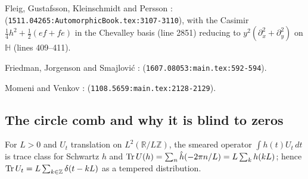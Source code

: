 \begin{citedfact}
\label{cit:fgkp-casimir-laplacian}
Fleig, Gustafsson, Kleinschmidt and Persson \cite{fleig2018eisenstein}:
\texttt{}
(\texttt{1511.04265:AutomorphicBook.tex:3107-3110}), with the Casimir
$\tfrac14 h^2 + \tfrac12(ef+fe)$ in the Chevalley basis (line 2851) reducing
to $y^2(\partial_x^2+\partial_y^2)$ on $\mathbb H$ (lines 409--411).
\end{citedfact}

\begin{citedfact}
\label{cit:fjs-scattering-det}
Friedman, Jorgenson and Smajlovi\'c \cite{friedman2016central}:
\texttt{}
(\texttt{1607.08053:main.tex:592-594}).
\end{citedfact}

\begin{citedfact}
\label{cit:mv-continuous-term}
Momeni and Venkov \cite{momeni2011zeta}:
\texttt{}
(\texttt{1108.5659:main.tex:2128-2129}).
\end{citedfact}

\subsection{The circle comb and why it is blind to zeros}

\begin{proposition}
\label{prop:circle-comb}
For $L>0$ and $U_t$ translation on $L^2(\mathbb R/L\mathbb Z)$, the smeared
operator $\int h(t)U_t\,dt$ is trace class for Schwartz $h$ and
$\operatorname{Tr} U(h) = \sum_n\hat h(-2\pi n/L) = L\sum_k h(kL)$; hence $\operatorname{Tr} U_t =
L\sum_{k\in\mathbb Z}\delta(t-kL)$ as a tempered distribution.
\end{proposition}

